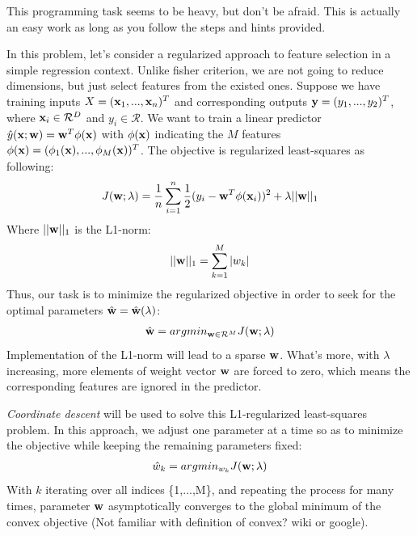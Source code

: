 \documentclass{article}
\theoremstyle{definition}
\theoremstyle{definition}
\theoremstyle{remark}
\begin{document}
This programming task seems to be heavy, but don't be afraid. This is actually an easy work as long as you follow the steps and hints provided.

In this problem, let's consider a regularized approach to feature selection in a simple regression context. Unlike fisher criterion, we are not going to reduce dimensions, but just select features from the existed ones. Suppose we have training inputs $X=(\bold{x}_{1},...,\bold{x}_{n})^{T}$ and corresponding outputs $\bold{y}=(y_{1},...,y_{2})^{T}$, where $\bold{x}_{i}\in \mathcal{R}^{D}$ and $y_{i}\in \mathcal{R}$. We want to train a linear predictor $\hat{y}(\bold{x};\bold{w})=\bold{w}^{T}\phi(\bold{x})$ with $\phi(\bold{x})$ indicating the $M$ features $\phi(\bold{x})=(\phi_{1}(\bold{x}),...,\phi_{M}(\bold{x}))^{T}$. The objective is regularized least-squares as following:
\begin{eqnarray}
J(\bold{w};\lambda)=\frac{1}{n}\sum_{i=1}^{n}\frac{1}{2}(y_{i}-\bold{w}^{T}\phi(\bold{x}_{i}))^{2}+\lambda||\bold{w}||_{1}
\end{eqnarray}
Where $||\bold{w}||_{1}$ is the L1-norm:
\begin{eqnarray}
||\bold{w}||_{1}=\sum_{k=1}^{M}|w_{k}|
\end{eqnarray}
Thus, our task is to minimize the regularized objective in order to seek for the optimal parameters $\hat{\bold{w}}=\hat{\bold{w}}(\lambda)$:
\begin{eqnarray}
\hat{\bold{w}}=arg min_{\bold{w}\in\mathcal{R}^{M}}J(\bold{w};\lambda)
\end{eqnarray}
Implementation of the L1-norm will lead to a sparse $\bold{w}$. What's more, with $\lambda$ increasing, more elements of weight vector $\bold{w}$ are forced to zero, which means the corresponding features are ignored in the predictor.

\emph{Coordinate descent} will be used to solve this L1-regularized least-squares problem. In this approach, we adjust one parameter at a time so as to minimize the objective while keeping the remaining parameters fixed:
\begin{eqnarray}
\hat{w}_{k}=argmin_{w_{k}}J(\bold{w};\lambda)
\end{eqnarray}
With $k$ iterating over all indices \{1,...,M\}, and repeating the process for many times, parameter $\bold{w}$ asymptotically converges to the global minimum of the convex objective (Not familiar with definition of convex? wiki or google).
\end{document}
